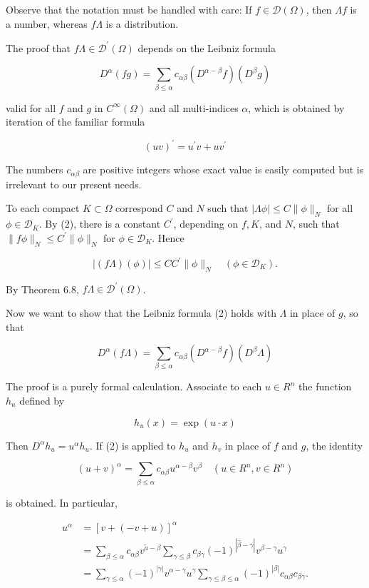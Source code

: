 \documentclass[10pt]{article}
\begin{document}
Observe that the notation must be handled with care: If $f \in \mathscr{D}(\Omega)$, then $\Lambda f$ is a number, whereas $f \Lambda$ is a distribution.

The proof that $f \Lambda \in \mathscr{D}^{\prime}(\Omega)$ depends on the Leibniz formula

$$
D^{\alpha}(f g)=\sum_{\beta \leq \alpha} c_{\alpha \beta}\left(D^{\alpha-\beta} f\right)\left(D^{\beta} g\right)
$$

valid for all $f$ and $g$ in $C^{\infty}(\Omega)$ and all multi-indices $\alpha$, which is obtained by iteration of the familiar formula

$$
(u v)^{\prime}=u^{\prime} v+u v^{\prime}
$$

The numbers $c_{\alpha \beta}$ are positive integers whose exact value is easily computed but is irrelevant to our present needs.

To each compact $K \subset \Omega$ correspond $C$ and $N$ such that $|\Lambda \phi| \leq C\|\phi\|_{N}$ for all $\phi \in \mathscr{D}_{K}$. By (2), there is a constant $C^{\prime}$, depending on $f, K$, and $N$, such that $\|f \phi\|_{N} \leq C^{\prime}\|\phi\|_{N}$ for $\phi \in \mathscr{D}_{K}$. Hence

$$
|(f \Lambda)(\phi)| \leq C C^{\prime}\|\phi\|_{N} \quad\left(\phi \in \mathscr{D}_{K}\right) .
$$

By Theorem 6.8, $f \Lambda \in \mathscr{D}^{\prime}(\Omega)$.

Now we want to show that the Leibniz formula (2) holds with $\Lambda$ in place of $g$, so that

$$
D^{\alpha}(f \Lambda)=\sum_{\beta \leq \alpha} c_{\alpha \beta}\left(D^{\alpha-\beta} f\right)\left(D^{\beta} \Lambda\right)
$$

The proof is a purely formal calculation. Associate to each $u \in R^{n}$ the function $h_{u}$ defined by

$$
h_{u}(x)=\exp (u \cdot x)
$$

Then $D^{\alpha} h_{u}=u^{\alpha} h_{u}$. If (2) is applied to $h_{u}$ and $h_{v}$ in place of $f$ and $g$, the identity

$$
(u+v)^{\alpha}=\sum_{\beta \leq \alpha} c_{\alpha \beta} u^{\alpha-\beta} v^{\beta} \quad\left(u \in R^{n}, v \in R^{n}\right)
$$

is obtained. In particular,

$$
\begin{aligned}
u^{\alpha} & =[v+(-v+u)]^{\alpha} \\
& =\sum_{\beta \leq \alpha} c_{\alpha \beta} v^{\tilde{a}-\beta} \sum_{\gamma \leq \beta} c_{\beta \gamma}(-1)^{|\hat{\beta}-\gamma|} v^{\beta-\gamma} u^{\gamma} \\
& =\sum_{\gamma \leq \alpha}(-1)^{|\gamma|} v^{\alpha-\gamma} u^{\gamma} \sum_{\gamma \leq \beta \leq \alpha}(-1)^{|\beta|} c_{\alpha \beta} c_{\beta \gamma} .
\end{aligned}
$$
\end{document}
